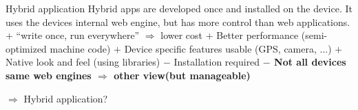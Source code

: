 \documentclass[english]{beamer}
\begin{document}
\begin{frame}{Hybrid application}
	Hybrid apps are developed once and installed on the device. It uses the devices internal web engine, but has more control than web applications.\newline
	\newline
	$+$ ``write once, run everywhere'' $\Rightarrow$ lower cost\newline
	$+$ Better performance (semi-optimized machine code)\newline
	$+$ Device specific features usable (GPS, camera, ...)\newline
	$+$ Native look and feel (using libraries)\newline
	$-$ Installation required\newline
	\textbf{$-$ Not all devices same web engines $\Rightarrow$ other view\newline (but manageable)}
		\vspace{0.8em}

	{\Large \color{red}  $\Rightarrow$ Hybrid application?}
\end{frame}

\end{document}

